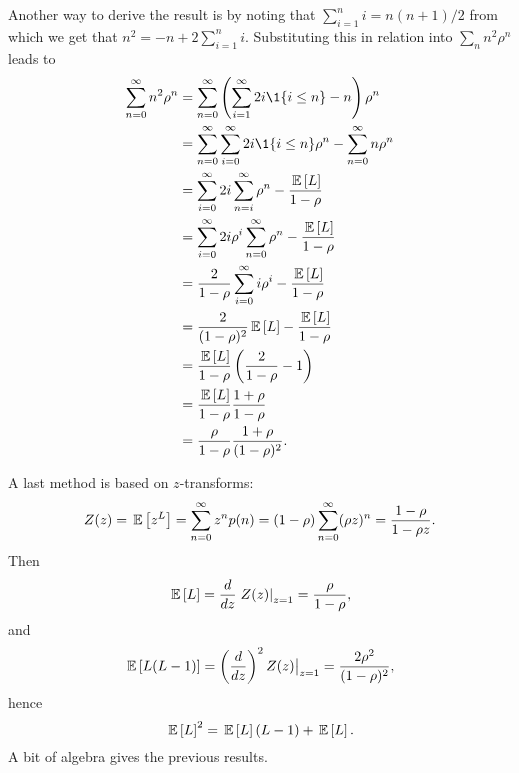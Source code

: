 \begin{question}
\begin{solution}
Another way to derive the result is by noting that
$\sum_{i=1}^n i= n(n+1)/2$ from which we get that
$n^2 = -n + 2\sum_{i=1}^n i$. Substituting this in relation into
$\sum_n n^2 \rho^n$ leads to
\begin{equation*}
  \begin{split}
    \sum_{n=0}^\infty n^2 \rho^n 
&=    \sum_{n=0}^\infty \left(\sum_{i=1}^\infty 2i \1{i\leq n}  - n\right)\rho^n \\
&=    \sum_{n=0}^\infty \sum_{i=0}^\infty 2i\1{i\leq n}\rho^n  - \sum_{n=0}^\infty n\rho^n \\
&=    \sum_{i=0}^\infty 2i \sum_{n=i}^\infty \rho^n  - \frac{\E L}{1-\rho} \\
&=    \sum_{i=0}^\infty 2i \rho^i \sum_{n=0}^\infty \rho^n  - \frac{\E L}{1-\rho} \\
&=    \frac2{1-\rho} \sum_{i=0}^\infty i \rho^i   - \frac{\E L}{1-\rho} \\
&=    \frac2{(1-\rho)^2} \E L - \frac{\E L}{1-\rho} \\
&=    \frac{\E L}{1-\rho}  \left(\frac2{1-\rho}  - 1\right) \\
&=    \frac{\E L}{1-\rho}  \frac{1+\rho}{1-\rho} \\
&=    \frac{\rho}{1-\rho}  \frac{1+\rho}{(1-\rho)^2}.
\end{split}
\end{equation*}

A last method is based on $z$-transforms:
\begin{equation*}
  Z(z) = \,\mathbb{E}\left[z^L\right] = \sum_{n=0}^\infty z^n p(n) = (1-\rho) \sum_{n=0}^\infty (\rho z)^n = \frac{1-\rho}{1-\rho z}.
\end{equation*}
Then 
\begin{equation*}
  \,\mathbb{E}\left[L\right] = \frac d {dz} \left. Z(z)\right|_{z=1} = \frac{\rho}{1-\rho},
\end{equation*}
and 
\begin{equation*}
  \,\mathbb{E}\left[L(L-1)\right]= \left(\frac d {dz}\right)^2  Z(z)\big|_{z=1} = \frac{2\rho^2}{(1-\rho)^2},
\end{equation*}
hence
\begin{equation*}
\,\mathbb{E}\left[L\right]^2 =   \,\mathbb{E}\left[L\right](L-1) + \,\mathbb{E}\left[L\right].
\end{equation*}
A bit of algebra gives the previous results.
  \end{solution}
\end{question}


